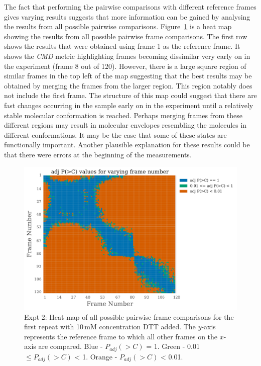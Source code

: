The fact that performing the pairwise comparisons with different reference frames gives varying results suggests that more information can be gained by analysing the results from all possible pairwise comparisons.
Figure~\ref{fig:heatmap - DTT} is a heat map showing the results from all possible pairwise frame comparisons.
The first row shows the results that were obtained using frame 1 as the reference frame.
It shows the \textit{CMD} metric highlighting frames becoming dissimilar very early on in the experiment (frame 8 out of 120).
However, there is a large square region of similar frames in the top left of the map suggesting that the best results may be obtained by merging the frames from the larger region.
This region notably does not include the first frame.
The structure of this map could suggest that there are fast changes occurring in the sample early on in the experiment until a relatively stable molecular conformation is reached.
Perhaps merging frames from these different regions may result in molecular envelopes resembling the molecules in different conformations.
It may be the case that some of these states are functionally important.
Another plausible explanation for these results could be that there were errors at the beginning of the measurements.
\begin{figure}
    \centering
    \includegraphics[width=1.0\textwidth]{figures/saxs/dtt_heatmap.pdf}
    \caption[Heat map of all possible pairwise frame comparisons for the first repeat with 10\,mM concentration DTT added]{Expt 2: Heat map of all possible pairwise frame comparisons for the first repeat with 10\,mM concentration DTT added.
    The $y$-axis represents the reference frame to which all other frames on the $x$-axis are compared.
    Blue - $P_{adj}(>C)$ = 1. Green - 0.01 $\le P_{adj}(>C)$ < 1. Orange - $P_{adj}(>C)$ < 0.01.}
    \label{fig:heatmap - DTT}
\end{figure}

